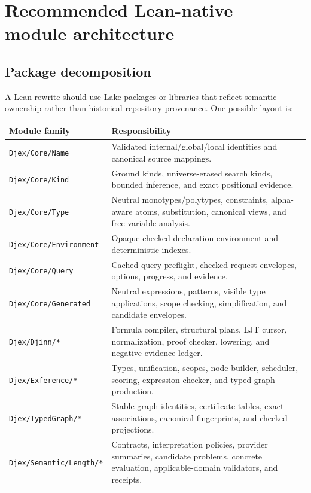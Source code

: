 \documentclass[10pt,letterpaper,oneside]{report}
\newcommand{\filepath}[1]{\nolinkurl{#1}}
\begin{document}
\chapter[Recommended Lean-native module architecture]{Recommended Lean-native\\module architecture}\label{ch:recommended-architecture}

\section{Package decomposition}

A Lean rewrite should use Lake packages or libraries that reflect semantic ownership rather than historical repository provenance. One possible layout is:

\begin{longtable}{@{}L{0.31\textwidth}L{0.61\textwidth}@{}}
\toprule
\textbf{Module family} & \textbf{Responsibility} \\
\midrule
\endhead
\filepath{Djex/Core/Name} & Validated internal/global/local identities and canonical source mappings. \\
\filepath{Djex/Core/Kind} & Ground kinds, universe-erased search kinds, bounded inference, and exact positional evidence. \\
\filepath{Djex/Core/Type} & Neutral monotypes/polytypes, constraints, alpha-aware atoms, substitution, canonical views, and free-variable analysis. \\
\filepath{Djex/Core/Environment} & Opaque checked declaration environment and deterministic indexes. \\
\filepath{Djex/Core/Query} & Cached query preflight, checked request envelopes, options, progress, and evidence. \\
\filepath{Djex/Core/Generated} & Neutral expressions, patterns, visible type applications, scope checking, simplification, and candidate envelopes. \\
\filepath{Djex/Djinn/*} & Formula compiler, structural plans, LJT cursor, normalization, proof checker, lowering, and negative-evidence ledger. \\
\filepath{Djex/Exference/*} & Types, unification, scopes, node builder, scheduler, scoring, expression checker, and typed graph production. \\
\filepath{Djex/TypedGraph/*} & Stable graph identities, certificate tables, exact associations, canonical fingerprints, and checked projections. \\
\filepath{Djex/Semantic/Length/*} & Contracts, interpretation policies, provider summaries, candidate problems, concrete evaluation, applicable-domain validators, and receipts. \\

\end{longtable}
\end{document}
